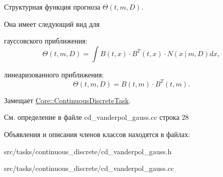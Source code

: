 Структурная функция прогноза $\Theta(t,m,D)$. 

Она имеет следующий вид для


\begin{DoxyItemize}
\item гауссовского приближения\+: \[\Theta(t,m,D) = \int B(t,x)\cdot B^T(t,x)\cdot N(x\ |\ m,D)dx,\]
\item линеаризованного приближения\+: \[\Theta(t,m,D) = B(t,m)\cdot B^T(t,m).\] 
\end{DoxyItemize}

Замещает \hyperlink{class_core_1_1_continuous_discrete_task_a961cc49fd0c72ba0a211bb4913ca3ece}{Core\+::\+Continuous\+Discrete\+Task}.



См. определение в файле cd\+\_\+vanderpol\+\_\+gauss.\+cc строка 28



Объявления и описания членов классов находятся в файлах\+:\begin{DoxyCompactItemize}
\item 
src/tasks/continuous\+\_\+discrete/cd\+\_\+vanderpol\+\_\+gauss.\+h\item 
src/tasks/continuous\+\_\+discrete/cd\+\_\+vanderpol\+\_\+gauss.\+cc\end{DoxyCompactItemize}
